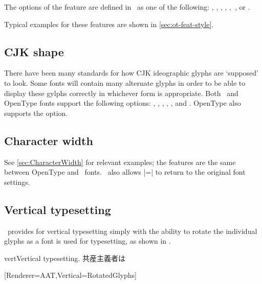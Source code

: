 \documentclass[a4paper]{l3doc}
\begin{document}
The options of the  feature
are defined in \AAT\ as one of the following: ,
, , ,
,\footnotemark\ , or .

Typical examples for these features are shown in \ref{sec:ot-feat-style}.






\subsection{CJK shape}
There have been many standards for how CJK ideographic
glyphs are `supposed' to look. Some fonts will contain many alternate
glyphs in order to be able to display these gylphs
correctly in whichever form is appropriate. Both \AAT\ and OpenType
fonts support the following  options:
, , , ,
, and . OpenType also supports the  option.

\subsection{Character width}
See \vref{sec:CharacterWidth} for relevant examples; the features are
the same between OpenType and \AAT\ fonts.
\AAT\ also allows |=| to return to
the original font settings.







\subsection{Vertical typesetting}

\XeTeX\ provides for vertical typesetting simply with the ability to rotate
the individual glyphs as a font is used for typesetting, as shown in
.

\begin{Xexample}[firstline=2]{vert}{Vertical typesetting.}
  \def\verttext{共産主義者は}
  \verttext

  [Renderer=AAT,Vertical=RotatedGlyphs]
  \rotatebox{-90}{\verttext}%
\end{Xexample}
\end{document}
